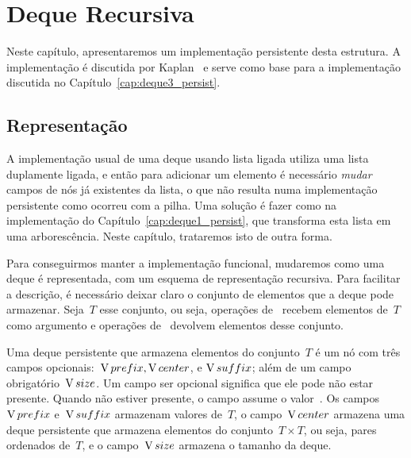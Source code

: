 \documentclass[main.tex]{subfiles}
\begin{document}
\chapter{Deque Recursiva} \label{cap:deque2_persist}

Neste capítulo, apresentaremos um implementação persistente desta estrutura. A implementação é discutida por Kaplan~\cite{Kaplan2001} e serve como base para a implementação discutida no Capítulo~\ref{cap:deque3_persist}.


\section{Representação}

A implementação usual de uma deque usando lista ligada utiliza uma lista duplamente ligada, e então para adicionar um elemento é necessário \emph{mudar} campos de nós já existentes da lista, o que não resulta numa implementação persistente como ocorreu com a pilha. Uma solução é fazer como na implementação do Capítulo~\ref{cap:deque1_persist}, que transforma esta lista em uma arborescência. Neste capítulo, trataremos isto de outra forma.

Para conseguirmos manter a implementação funcional, mudaremos como uma deque é representada, com um esquema de representação recursiva. Para facilitar a descrição, é necessário deixar claro o conjunto de elementos que a deque pode armazenar. Seja~$T$ esse conjunto, ou seja, operações de~ recebem elementos de~$T$ como argumento e operações de~ devolvem elementos desse conjunto.

Uma deque persistente que armazena elementos do conjunto~$T$ é um nó com três campos opcionais:~$\operatorname{V}{prefix}, \operatorname{V}{center}$, e $\operatorname{V}{suffix}$; além de um campo obrigatório~$\operatorname{V}{size}$. Um campo ser opcional significa que ele pode não estar presente. Quando não estiver presente, o campo assume o valor~. Os campos~$\operatorname{V}{prefix}$ e~$\operatorname{V}{suffix}$ armazenam valores de~$T$, o campo~$\operatorname{V}{center}$ armazena uma deque persistente que armazena elementos do conjunto~$T \times T$, ou seja, pares ordenados de~$T$, e o campo~$\operatorname{V}{size}$ armazena o tamanho da deque.
\end{document}
